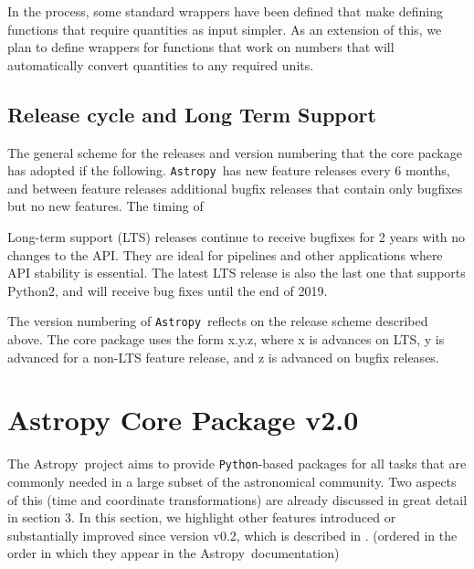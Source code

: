 \documentclass[modern]{aastex61}
\newcommand{\package}[1]{\texttt{#1}}
\newcommand{\python}{\package{Python}}
\newcommand{\astropy}{Astropy}
\newcommand{\astropypkg}{\package{Astropy}}
\begin{document}
In the process, some standard wrappers have been defined that make defining functions that require quantities as input simpler. As an extension of this, we plan to define wrappers for functions that work on numbers that will automatically convert quantities to any required units.

\subsection{Release cycle and Long Term Support}
%
\par The general scheme for the releases and version numbering that the core
package has adopted if the following. \astropypkg\ has new feature releases every
6 months, and between feature releases additional bugfix releases that
contain only bugfixes but no new features. The timing of
%
\par Long-term support (LTS) releases continue to receive bugfixes for 2
years with no changes to the API. They are ideal for pipelines and other
applications where API stability is essential. The latest LTS release is
also the last one that supports Python2, and will receive bug fixes until the
end of 2019.
%
\par The version numbering of \astropypkg\ reflects on the release scheme
described above. The core package uses the form x.y.z, where x is advances
on LTS, y is advanced for a non-LTS feature release, and z is advanced on
bugfix releases.


\section{Astropy Core Package v2.0}
\label{sec:core}
The \astropy\ project aims to provide \python-based packages for all tasks that are commonly needed in a large subset of the astronomical community. Two aspects of this (time and coordinate transformations) are already discussed in great detail in section 3. In this section, we highlight other features introduced or substantially improved since version v0.2, which is described in \citet{astropy}.
(ordered in the order in which they appear in the \astropy\ documentation)
\end{document}
